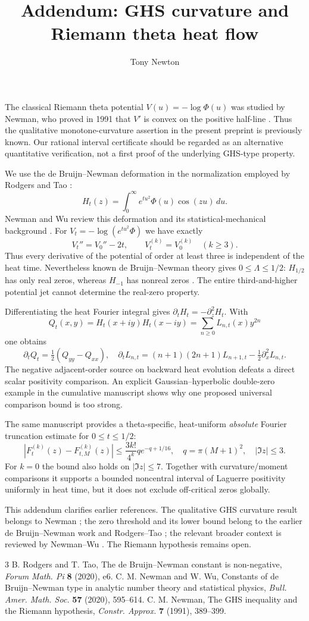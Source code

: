\documentclass[10pt]{article}
\title{Addendum: GHS curvature and Riemann theta heat flow}
\author{Tony Newton}
\date{}
\begin{document}
\maketitle
The classical Riemann theta potential $V(u)=-\log\Phi(u)$
was studied by Newman, who proved in 1991 that $V'$
is convex on the positive half-line \cite{GHS}.
Thus the qualitative monotone-curvature assertion in
the present preprint is previously known. Our rational
interval certificate should be regarded as an alternative
quantitative verification, not a first proof of the
underlying GHS-type property.

We use the de Bruijn--Newman deformation in the
normalization employed by Rodgers and Tao \cite{RT}:
\[
H_t(z)=\int_0^\infty e^{tu^2}\Phi(u)\cos(zu)\,du .
\]
Newman and Wu review this deformation and its
statistical-mechanical background \cite{NW}. For
$V_t=-\log(e^{tu^2}\Phi)$ we have exactly
\[
V_t''=V_0''-2t,\qquad
V_t^{(k)}=V_0^{(k)}\quad(k\ge3).
\]
Thus every derivative of the potential of order
at least three is independent of the heat time.
Nevertheless known de Bruijn--Newman theory gives
$0\le\Lambda\le1/2$: $H_{1/2}$ has only
real zeros, whereas $H_{-1}$ has nonreal
zeros \cite{RT,NW}. The entire third-and-higher
potential jet cannot determine the real-zero property.

Differentiating the heat Fourier integral gives
$\partial_tH_t=-\partial_z^2H_t$. With
\[
Q_t(x,y)=H_t(x+iy)H_t(x-iy)
=\sum_{n\ge0}L_{n,t}(x)y^{2n}
\]
one obtains
\[
\partial_tQ_t=\tfrac12(Q_{yy}-Q_{xx}),\quad
\partial_tL_{n,t}
=(n+1)(2n+1)L_{n+1,t}
-\tfrac12\partial_x^2L_{n,t}.
\]
The negative adjacent-order source on backward
heat evolution defeats a direct scalar positivity
comparison. An explicit Gaussian--hyperbolic
double-zero example in the cumulative manuscript
shows why one proposed universal comparison
bound is too strong.

The same manuscript provides a theta-specific,
heat-uniform \emph{absolute} Fourier truncation
estimate for $0\le t\le1/2$:
\[
|F_t^{(k)}(z)-F_{t,M}^{(k)}(z)|
\le \frac{3k!}{4^k}q e^{-q+1/16},
\quad q=\pi(M+1)^2,\quad|\Im z|\le3 .
\]
For $k=0$ the bound also holds on $|\Im z|\le7$.
Together with curvature/moment comparisons it
supports a bounded noncentral interval of
Laguerre positivity uniformly in heat time, but
it does not exclude off-critical zeros globally.

This addendum clarifies earlier references.
The qualitative GHS curvature result belongs
to Newman \cite{GHS}; the zero threshold and
its lower bound belong to the earlier
de Bruijn--Newman work and Rodgers--Tao
\cite{RT}; the relevant broader context is
reviewed by Newman--Wu \cite{NW}.
The Riemann hypothesis remains open.

\begin{thebibliography}{3}
 B. Rodgers and T. Tao,
The de Bruijn--Newman constant is non-negative,
\emph{Forum Math. Pi} \textbf{8} (2020), e6.
 C. M. Newman and W. Wu,
Constants of de Bruijn--Newman type in analytic
number theory and statistical physics,
\emph{Bull. Amer. Math. Soc.} \textbf{57} (2020), 595--614.
 C. M. Newman,
The GHS inequality and the Riemann hypothesis,
\emph{Constr. Approx.} \textbf{7} (1991), 389--399.
\end{thebibliography}
\end{document}
